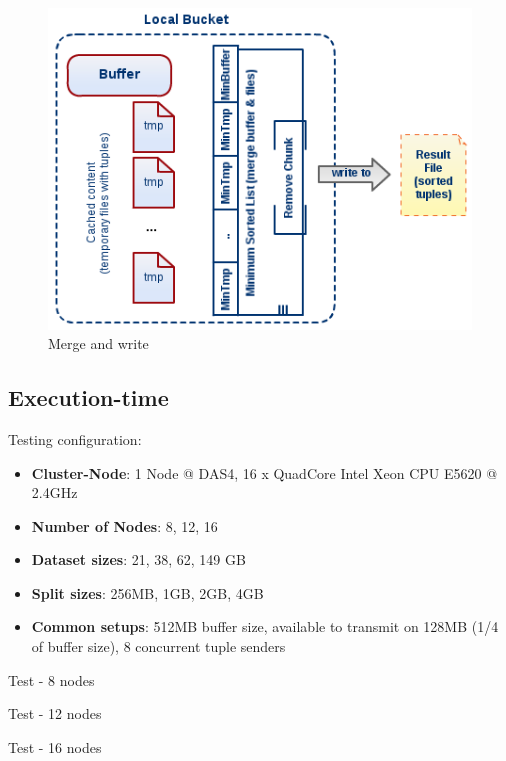 \begin{figure}
\centering
\includegraphics[scale=0.6]{diag3}
\caption{Merge and write}
\label{fig:diag3}
\end{figure}

\pagebreak

% 
\subsection{Execution-time}

Testing configuration: 
\begin{itemize}
	\item \textbf{Cluster-Node}: 1 Node @ DAS4, 16 x QuadCore Intel Xeon CPU E5620 @ 2.4GHz 
	\item \textbf{Number of Nodes}: 8, 12, 16
	\item \textbf{Dataset sizes}: 21, 38, 62, 149 GB
	\item \textbf{Split sizes}: 256MB, 1GB, 2GB, 4GB
	\item \textbf{Common setups}: 512MB buffer size, available to transmit on 128MB (1/4 of buffer size), 8 concurrent tuple senders
\end{itemize}

Test - 8 nodes
\newline \newline
\renewcommand{\arraystretch}{1.2}
{\footnotesize\tt

}

Test - 12 nodes
\newline \newline
\renewcommand{\arraystretch}{1.2}
{\footnotesize\tt

}

Test - 16 nodes
\newline \newline
\renewcommand{\arraystretch}{1.2}
{\footnotesize\tt

}

